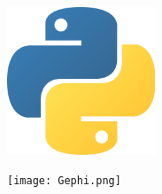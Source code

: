 \documentclass{article}
\begin{document}
\begin{figure}[h!]
\begin{flushright}
\includegraphics[width=125pt]{python.png}
\end{flushright}
\end{figure}



\begin{figure}[h!]
\begin{flushright}
\texttt{[image: Gephi.png]}
\end{flushright}
\end{figure}
\end{document}
